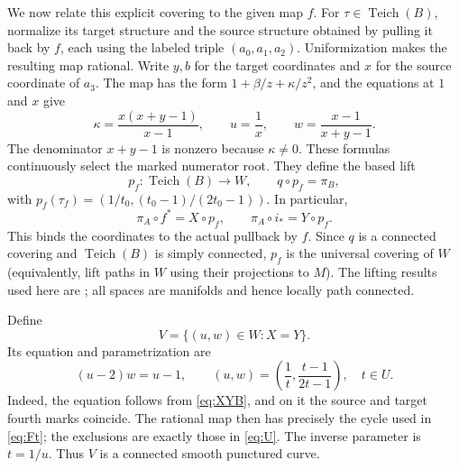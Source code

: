\documentclass[11pt]{article}
\newcommand{\Teich}{\operatorname{Teich}}
\theoremstyle{remark}
\begin{document}
We now relate this explicit covering to the given map $f$. For $\tau\in\Teich(B)$, normalize its target structure and the source structure obtained by pulling it back by $f$, each using the labeled triple $(a_0,a_1,a_2)$. Uniformization makes the resulting map rational. Write $y,b$ for the target coordinates and $x$ for the source coordinate of $a_3$. The map has the form $1+\beta/z+\kappa/z^2$, and the equations at $1$ and $x$ give
\[
 \kappa=\frac{x(x+y-1)}{x-1},\qquad
 u=\frac1x,\qquad w=\frac{x-1}{x+y-1}.
\]
The denominator $x+y-1$ is nonzero because $\kappa\ne0$. These formulas continuously select the marked numerator root. They define the based lift
\begin{equation}\label{eq:pf}
 p_f:\Teich(B)\longrightarrow W,\qquad q\circ p_f=\pi_B,
\end{equation}
with $p_f(\tau_f)=(1/t_0,(t_0-1)/(2t_0-1))$. In particular,
\begin{equation}\label{eq:intended}
 \pi_A\circ f^*=X\circ p_f,\qquad
 \pi_A\circ i_*=Y\circ p_f.
\end{equation}
This binds the coordinates to the actual pullback by $f$. Since $q$ is a connected covering and $\Teich(B)$ is simply connected, $p_f$ is the universal covering of $W$ (equivalently, lift paths in $W$ using their projections to $M$). The lifting results used here are \cite[Section 1.3, Propositions 1.31--1.34]{Hatcher}; all spaces are manifolds and hence locally path connected.

Define
\[
 V=\{(u,w)\in W:X=Y\}.
\]
Its equation and parametrization are
\begin{equation}\label{eq:V}
 (u-2)w=u-1,\qquad
 (u,w)=\left(\frac1t,\frac{t-1}{2t-1}\right),\quad t\in U.
\end{equation}
Indeed, the equation follows from \eqref{eq:XYB}, and on it the source and target fourth marks coincide. The rational map then has precisely the cycle used in \eqref{eq:Ft}; the exclusions are exactly those in \eqref{eq:U}. The inverse parameter is $t=1/u$. Thus $V$ is a connected smooth punctured curve.
\end{document}
